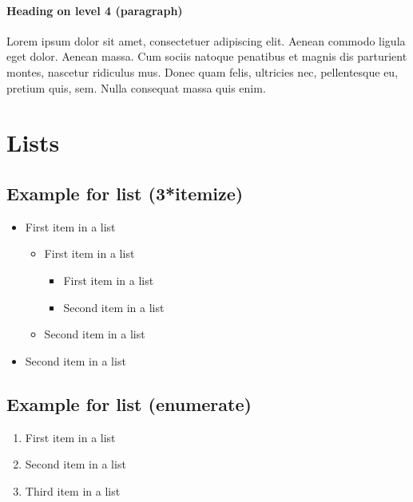 \documentclass[paper=a4, fontsize=11pt]{scrartcl}
\numberwithin{equation}{section}		%
\numberwithin{figure}{section}			%
\numberwithin{table}{section}				%
\begin{document}
\paragraph{Heading on level 4 (paragraph)}
Lorem ipsum dolor sit amet, consectetuer adipiscing elit. Aenean commodo ligula eget dolor. Aenean massa. Cum sociis natoque penatibus et magnis dis parturient montes, nascetur ridiculus mus. Donec quam felis, ultricies nec, pellentesque eu, pretium quis, sem. Nulla consequat massa quis enim. 


\section{Lists}

\subsection{Example for list (3*itemize)}
\begin{itemize}
	\item First item in a list 
		\begin{itemize}
		\item First item in a list 
			\begin{itemize}
			\item First item in a list 
			\item Second item in a list 
			\end{itemize}
		\item Second item in a list 
		\end{itemize}
	\item Second item in a list 
\end{itemize}

\subsection{Example for list (enumerate)}
\begin{enumerate}
	\item First item in a list 
	\item Second item in a list 
	\item Third item in a list
\end{enumerate}
\end{document}
